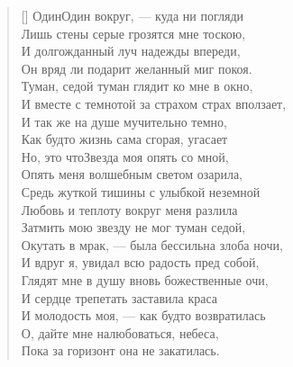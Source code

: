 \settowidth{\versewidth}{Средь жуткой тишины с улыбкой неземной}
\begin{verse}[\versewidth]
Один\ldotst Один вокруг, --- куда ни погляди\\
Лишь стены серые грозятся мне тоскою,\\
И долгожданный луч надежды впереди,\\
Он вряд ли подарит желанный миг покоя.\\
Туман, седой туман глядит ко мне в окно,\\
И вместе с темнотой за страхом страх вползает,\\
И так же на душе мучительно темно,\\
Как будто жизнь сама сгорая, угасает\ldotst\\
Но, это что\ldotsq Звезда моя опять со мной,\\
Опять меня волшебным светом озарила,\\
Средь жуткой тишины с улыбкой неземной\\
Любовь и теплоту вокруг меня разлила\ldotst\\
Затмить мою звезду не мог туман седой,\\
Окутать в мрак, --- была бессильна злоба ночи,\\
И вдруг я, увидал всю радость пред собой,\\
Глядят мне в душу вновь божественные очи,\\
И сердце трепетать заставила краса\ldotst\\
И молодость моя, --- как будто возвратилась\ldotst\\
О, дайте мне налюбоваться, небеса,\\
Пока за горизонт она не закатилась.
\end{verse}

